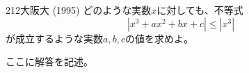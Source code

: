 \begin{thm}{212}{}{大阪大 (1995)}
 どのような実数$x$に対しても、不等式
 \[ |x^3+ax^2+bx+c| \le |x^3| \]
 が成立するような実数$a, b, c$の値を求めよ。
\end{thm}

ここに解答を記述。